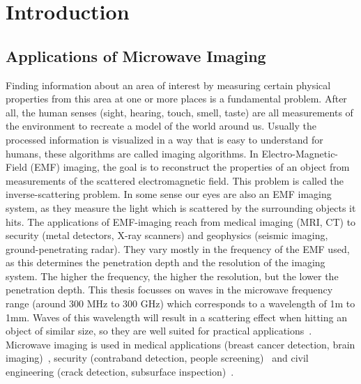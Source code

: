 
\chapter{Introduction}\label{chapter:introduction}

\section{Applications of Microwave Imaging}
Finding information about an area of interest by measuring certain physical properties from this area at one or more places is a fundamental problem.
After all, the human senses (sight, hearing, touch, smell, taste) are all measurements of the environment to recreate a model of the world around us.
Usually the processed information is visualized in a way that is easy to understand for humans, these algorithms are called imaging algorithms.
In Electro-Magnetic-Field (EMF) imaging, the goal is to reconstruct the properties of an object from measurements of the scattered electromagnetic field.
This problem is called the inverse-scattering problem.
In some sense our eyes are also an EMF imaging system, as they measure the light  which is scattered by the surrounding objects it hits.
The applications of EMF-imaging reach from medical imaging (MRI, CT) to security (metal detectors, X-ray scanners) and geophysics (seismic imaging, ground-penetrating radar).
They vary mostly in the frequency of the EMF used, as this determines the penetration depth and the resolution of the imaging system.
The higher the frequency, the higher the resolution, but the lower the penetration depth.
This thesis focusses on waves in the microwave frequency range (around 300 MHz to 300 GHz) which corresponds to a wavelength of 1m to 1mm.
Waves of this wavelength will result in a scattering effect when hitting an object of similar size, so they are well suited for practical applications~\parencite{pastorino_microwave_2018}.
Microwave imaging is used in medical applications (breast cancer detection, brain imaging)~\parencite{wang_medical_2014}, security (contraband detection, people screening)~\parencite{ahmed_microwave_2021} and civil engineering (crack detection, subsurface inspection)~\parencite{pastorino_microwave_2018}.

